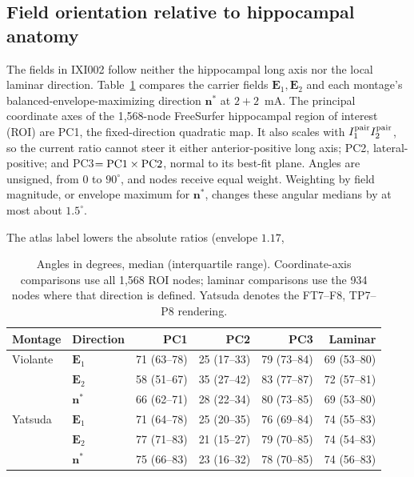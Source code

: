 \documentclass[11pt,a4paper]{article}
\providecommand{\DIFaddtex}[1]{{\protect\color{blue} \sf #1}} %
\providecommand{\DIFdeltex}[1]{{\protect\color{red} \scriptsize #1}} %
\providecommand{\DIFaddbegin}{} %
\providecommand{\DIFaddend}{} %
\providecommand{\DIFdelbegin}{} %
\providecommand{\DIFdelend}{} %
\providecommand{\DIFadd}[1]{\texorpdfstring{\DIFaddtex{#1}}{#1}} %
\providecommand{\DIFdel}[1]{\texorpdfstring{\DIFdeltex{#1}}{}} %
\begin{document}
\subsection{\DIFadd{Field orientation relative to hippocampal anatomy}}\label{supp:fem-orientation}
\DIFadd{The fields in IXI002 follow neither the hippocampal long axis nor the local
laminar direction. Table~\ref{tab:fem-orientation} compares the carrier fields
$\mathbf E_1,\mathbf E_2$ and each montage's balanced-envelope-maximizing
direction $\mathbf n^*$ at $2+2$~mA.
The principal coordinate axes of the 1,568-node FreeSurfer hippocampal region
of interest (ROI) are PC1, }\DIFaddend the \DIFdelbegin \DIFdel{fixed-direction quadratic map. It also
scales with $I_1^{\rm pair}I_2^{\rm pair}$, so the current ratio cannot steer it
either}\DIFdelend \DIFaddbegin \DIFadd{anterior-positive long axis; PC2, lateral-positive; and
PC3$={\rm PC1}\times{\rm PC2}$, normal to its best-fit plane. Angles are
unsigned, from $0$ to $90^\circ$, and nodes receive equal weight.
Weighting by field magnitude, or envelope maximum for $\mathbf n^*$,
changes these angular medians by at most about $1.5^\circ$}\DIFaddend .

\DIFdelbegin \DIFdel{The atlas label lowers the absolute ratios (envelope $1.17$, }\DIFdelend \DIFaddbegin \begin{table}[htbp]
\color{blue}
\centering\small
\setlength{\tabcolsep}{3pt}
\begin{tabular}{@{}llrrrr@{}}
\toprule
Montage & Direction & PC1 & PC2 & PC3 & Laminar\\
\midrule
Violante & $\mathbf E_1$ & 71 (63--78) & 25 (17--33) & 79 (73--84) & 69 (53--80)\\
 & $\mathbf E_2$ & 58 (51--67) & 35 (27--42) & 83 (77--87) & 72 (57--81)\\
 & $\mathbf n^*$ & 66 (62--71) & 28 (22--34) & 80 (73--85) & 69 (53--80)\\
Yatsuda & $\mathbf E_1$ & 71 (64--78) & 25 (20--35) & 76 (69--84) & 74 (55--83)\\
 & $\mathbf E_2$ & 77 (71--83) & 21 (15--27) & 79 (70--85) & 74 (54--83)\\
 & $\mathbf n^*$ & 75 (66--83) & 23 (16--32) & 78 (70--85) & 74 (56--83)\\
\bottomrule
\end{tabular}
\caption{\color{blue}Angles in degrees, median (interquartile range). Coordinate-axis
comparisons use all 1,568 ROI nodes; laminar comparisons use the 934 nodes
where that direction is defined. Yatsuda denotes the FT7--F8, TP7--P8
rendering.}
\label{tab:fem-orientation}
\end{table}
\end{document}

